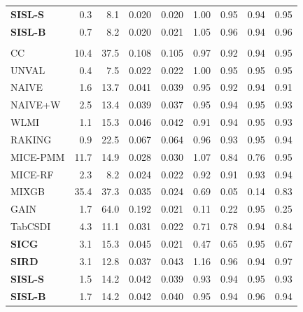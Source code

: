 \begin{longtable}{lrrrrrrrr}
\textbf{SISL-S} & \cellcolor{ranktwo}0.3 & \cellcolor{ranktwo}8.1 & 0.020 & 0.020 & 1.00 & \cellcolor{rankone}0.95 & 0.94 & 0.95 \\
\textbf{SISL-B} & 0.7 & \cellcolor{rankthree}8.2 & 0.020 & 0.021 & 1.05 & 0.96 & 0.94 & 0.96 \\
\addlinespace[3pt]
\multicolumn{9}{l}{\textbf{Binary \& Categorical Phase-One Covariates}} \\
\addlinespace[2pt]
CC & 10.4 & 37.5 & 0.108 & 0.105 & \cellcolor{ranktwo}0.97 & 0.92 & 0.94 & \cellcolor{ranktwo}0.95 \\
UNVAL & \cellcolor{rankone}0.4 & \cellcolor{rankone}7.5 & 0.022 & 0.022 & \cellcolor{rankone}1.00 & \cellcolor{rankone}0.95 & 0.95 & \cellcolor{rankone}0.95 \\
NAIVE & 1.6 & 13.7 & 0.041 & 0.039 & 0.95 & 0.92 & 0.94 & 0.91 \\
NAIVE+W & 2.5 & 13.4 & 0.039 & 0.037 & 0.95 & 0.94 & \cellcolor{ranktwo}0.95 & 0.93 \\
WLMI & \cellcolor{rankthree}1.1 & 15.3 & 0.046 & 0.042 & 0.91 & \cellcolor{rankthree}0.94 & 0.95 & 0.93 \\
RAKING & \cellcolor{ranktwo}0.9 & 22.5 & 0.067 & 0.064 & \cellcolor{rankthree}0.96 & 0.93 & 0.95 & 0.94 \\
MICE-PMM & 11.7 & 14.9 & 0.028 & 0.030 & 1.07 & 0.84 & 0.76 & \cellcolor{rankthree}0.95 \\
MICE-RF & 2.3 & \cellcolor{ranktwo}8.2 & 0.024 & 0.022 & 0.92 & 0.91 & 0.93 & 0.94 \\
MIXGB & 35.4 & 37.3 & 0.035 & 0.024 & 0.69 & 0.05 & 0.14 & 0.83 \\
GAIN & 1.7 & 64.0 & 0.192 & 0.021 & 0.11 & 0.22 & \cellcolor{rankthree}0.95 & 0.25 \\
TabCSDI & 4.3 & \cellcolor{rankthree}11.1 & 0.031 & 0.022 & 0.71 & 0.78 & 0.94 & 0.84 \\
\textbf{SICG} & 3.1 & 15.3 & 0.045 & 0.021 & 0.47 & 0.65 & 0.95 & 0.67 \\
\textbf{SIRD} & 3.1 & 12.8 & 0.037 & 0.043 & 1.16 & 0.96 & 0.94 & 0.97 \\
\textbf{SISL-S} & 1.5 & 14.2 & 0.042 & 0.039 & 0.93 & 0.94 & \cellcolor{rankone}0.95 & 0.93 \\
\textbf{SISL-B} & 1.7 & 14.2 & 0.042 & 0.040 & 0.95 & \cellcolor{ranktwo}0.94 & 0.96 & 0.94 \\
\end{longtable}
